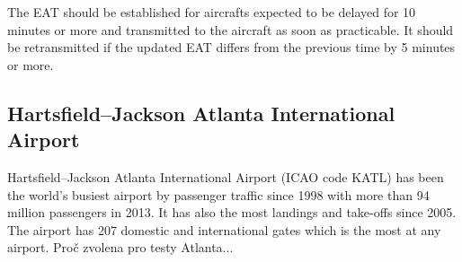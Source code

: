 The EAT should be established for aircrafts expected to be delayed for 10 minutes or more and transmitted to the aircraft as soon as practicable. It should be retransmitted if the updated EAT differs from the previous time by 5 minutes or more.\cite[Chapter 6.5.7]{doc4444}

\subsection{Hartsfield–Jackson Atlanta International Airport}
Hartsfield–Jackson Atlanta International Airport (ICAO code KATL) has been the world's busiest airport by passenger traffic since 1998 with more than 94 million passengers in 2013. It has also the most landings and take-offs since 2005. The airport has 207 domestic and international gates which is the most at any airport. \cite{atlanta}
 Proč zvolena pro testy Atlanta...
